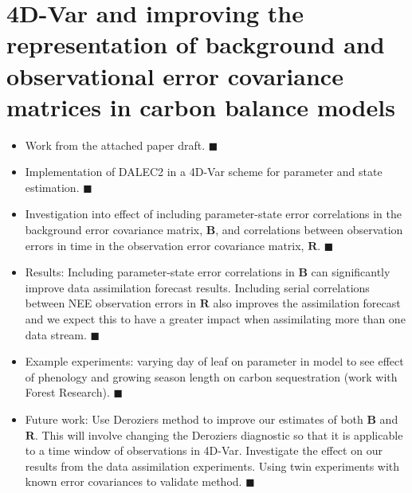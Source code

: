 \documentclass[11pt]{article}
\begin{document}
\section{4D-Var and improving the representation of background and observational error covariance matrices in carbon balance models} \label{sec:b&r}
\begin{itemize}
\item Work from the attached paper draft. {\color{green} $\blacksquare$}
\item Implementation of DALEC2 in a 4D-Var scheme for parameter and state estimation. {\color{green} $\blacksquare$}
\item Investigation into effect of including parameter-state error correlations in the background error covariance matrix, $\textbf{B}$, and correlations between observation errors in time in the observation error covariance matrix, $\textbf{R}$. {\color{green} $\blacksquare$}
\item Results: Including parameter-state error correlations in $\textbf{B}$ can significantly improve data assimilation forecast results. Including serial correlations between NEE observation errors in $\textbf{R}$ also improves the assimilation forecast and we expect this to have a greater impact when assimilating more than one data stream. {\color{green} $\blacksquare$}
\item Example experiments: varying day of leaf on parameter in model to see effect of phenology and growing season length on carbon sequestration (work with Forest Research). {\color{green} $\blacksquare$}
\item Future work: Use Deroziers method to improve our estimates of both $\textbf{B}$ and $\textbf{R}$. This will involve changing the Deroziers diagnostic so that it is applicable to a time window of observations in 4D-Var. Investigate the effect on our results from the data assimilation experiments. Using twin experiments with known error covariances to validate method. {\color{red} $\blacksquare$}
\end{itemize}
\end{document}
